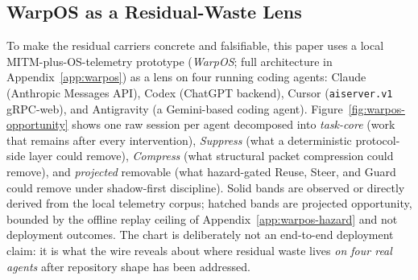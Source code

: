 \documentclass[conference]{IEEEtran}
\begin{document}
\subsection{WarpOS as a Residual-Waste Lens}
\label{sec:warpos-lens}

To make the residual carriers concrete and falsifiable, this paper uses a local MITM-plus-OS-telemetry prototype (\emph{WarpOS}; full architecture in Appendix~\ref{app:warpos}) as a lens on four running coding agents: Claude (Anthropic Messages API), Codex (ChatGPT backend), Cursor (\texttt{aiserver.v1} gRPC-web), and Antigravity (a Gemini-based coding agent). Figure~\ref{fig:warpos-opportunity} shows one raw session per agent decomposed into \emph{task-core} (work that remains after every intervention), \emph{Suppress} (what a deterministic protocol-side layer could remove), \emph{Compress} (what structural packet compression could remove), and \emph{projected} removable (what hazard-gated Reuse, Steer, and Guard could remove under shadow-first discipline). Solid bands are observed or directly derived from the local telemetry corpus; hatched bands are projected opportunity, bounded by the offline replay ceiling of Appendix~\ref{app:warpos-hazard} and not deployment outcomes. The chart is deliberately not an end-to-end deployment claim: it is what the wire reveals about where residual waste lives \emph{on four real agents} after repository shape has been addressed.
\end{document}
